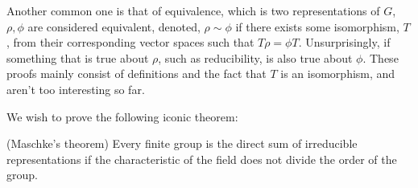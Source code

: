 \documentclass{article}
\begin{document}
Another common one is that of equivalence, which is two representations of $G$, $\rho, \phi$  are considered equivalent, denoted, $\rho \sim \phi$ if there exists some isomorphism, $T$, from their corresponding vector spaces such that $T\rho=\phi T$. Unsurprisingly, if something that is true about $\rho$, such as reducibility, is also true about $\phi$. These proofs mainly consist of definitions and the fact that $T$ is an isomorphism, and aren't too interesting so far.

We wish to prove the following iconic theorem:

\begin{theorem}
(Maschke's theorem) Every finite group is the direct sum of irreducible representations if the characteristic of the field does not divide the order of the group.
\end{theorem}
\end{document}
